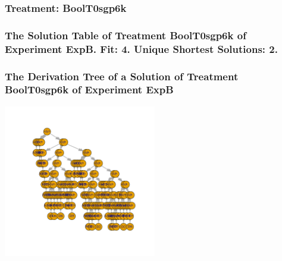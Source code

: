 \documentclass[18pt,c]{beamer}
\begin{document}
 \begin{frame}
 \fontsize{8pt}{9pt}\selectfont
 \frametitle{ Treatment: BoolT0sgp6k }

 \label{ExpBStatsTable011.tex}  
 \end{frame}

 \begin{frame}
 \fontsize{8pt}{9pt}\selectfont
 \frametitle{ The Solution Table of Treatment BoolT0sgp6k of Experiment ExpB. Fit: 4. Unique Shortest Solutions: 2. }

 \label{ExpBSolutionTable004.tex}  
 \end{frame}

 \begin{frame}
 \frametitle{ The Derivation Tree of a Solution of Treatment BoolT0sgp6k of Experiment ExpB }
 \begin{center}
\includegraphics[width=0.5\textwidth, angle=0]
{ExpBDerivationTreeFigure004.pdf}
 \end{center}
 \label{report/ExpBDerivationTreeFigure004.pdf}  
 \end{frame}
\end{document}
